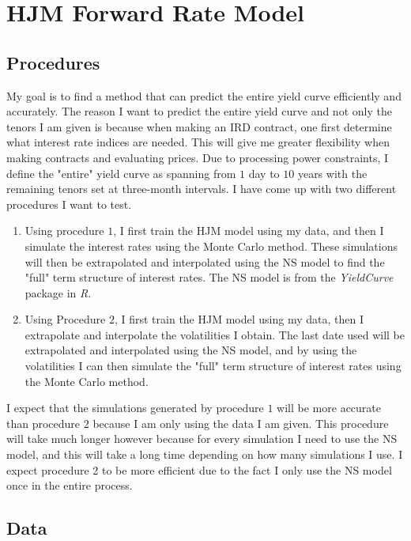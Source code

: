 

\section{HJM Forward Rate Model}

\subsection{Procedures}

\noindent My goal is to find a method that can predict the entire yield curve efficiently and accurately. The reason I want to predict the entire yield curve and not only the tenors I am given is because when making an IRD contract, one first determine what interest rate indices are needed. This will give me greater flexibility when making contracts and evaluating prices. Due to processing power constraints, I define the "entire" yield curve as spanning from $1$ day to $10$ years with the remaining tenors set at three-month intervals. I have come up with two different procedures I want to test. \begin{enumerate}
    \item Using procedure $1$, I first train the HJM model using my data, and then I simulate the interest rates using the Monte Carlo method. These simulations will then be extrapolated and interpolated using the NS model to find the "full" term structure of interest rates. The NS model is from the \textit{YieldCurve} package in \textit{R}.
    \item Using Procedure $2$, I first train the HJM model using my data, then I extrapolate and interpolate the volatilities I obtain. The last date used will be extrapolated and interpolated using the NS model, and by using the volatilities I can then simulate the "full" term structure of interest rates using the Monte Carlo method.
\end{enumerate} I expect that the simulations generated by procedure $1$ will be more accurate than procedure $2$ because I am only using the data I am given. This procedure will take much longer however because for every simulation I need to use the NS model, and this will take a long time depending on how many simulations I use. I expect procedure 2 to be more efficient due to the fact I only use the NS model once in the entire process.

\newpage


\subsection{Data}

